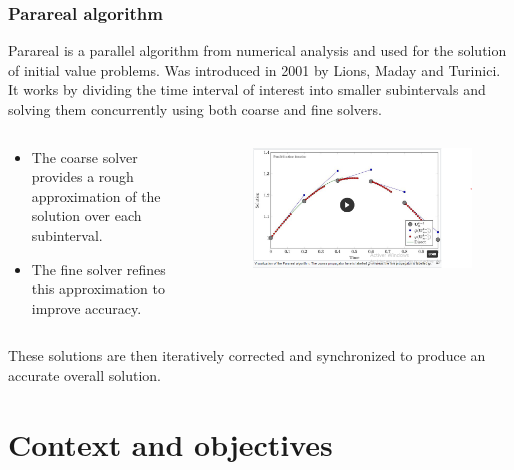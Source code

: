 \documentclass[
	11pt,
]{beamer}
\begin{document}
\begin{frame}
    \frametitle{Parareal algorithm}
    Parareal is a parallel algorithm from numerical analysis and used for
    the solution of initial value problems\cite{lions2001resolution}.
    Was introduced in 2001 by Lions, Maday and Turinici.
    \vspace{\baselineskip}
    It works by dividing the time interval of interest into smaller subintervals and
    solving them concurrently using both coarse and fine solvers.
    \begin{columns}[c]
        \begin{column}{0.45\textwidth}
            \begin{itemize}
                \item The coarse solver provides a rough approximation of the solution over each subinterval.
                \item The fine solver refines this approximation to improve accuracy.
            \end{itemize}
        \end{column}
        \begin{column}{0.5\textwidth}
            \begin{figure}
                \includegraphics[width=1.\linewidth]{parareal.png}
            \end{figure}
        \end{column}
    \end{columns}
    These solutions are then iteratively corrected and synchronized to produce an accurate overall solution.
\end{frame}


\section{Context and objectives}
\end{document}
